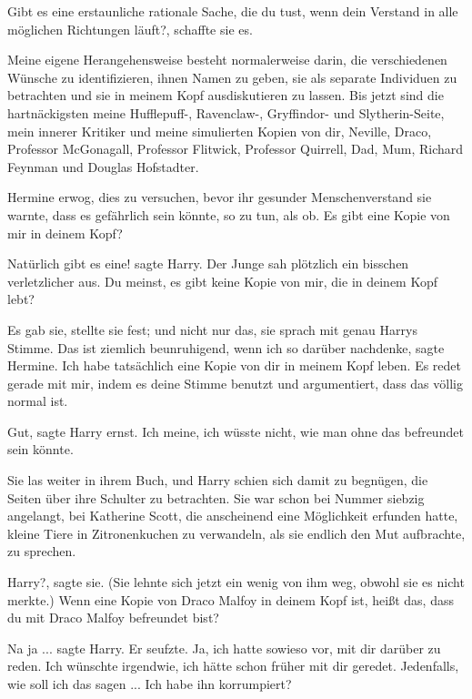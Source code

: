 \glqq{}Gibt es eine erstaunliche rationale Sache, die du tust, wenn dein Verstand
in alle möglichen Richtungen läuft?\grqq{}, schaffte sie es.

\glqq{}Meine eigene Herangehensweise besteht normalerweise darin, die
verschiedenen Wünsche zu identifizieren, ihnen Namen zu geben, sie als separate
Individuen zu betrachten und sie in meinem Kopf ausdiskutieren zu lassen. Bis
jetzt sind die hartnäckigsten meine Hufflepuff-, Ravenclaw-, Gryffindor- und
Slytherin-Seite, mein innerer Kritiker und meine simulierten Kopien von dir,
Neville, Draco, Professor McGonagall, Professor Flitwick, Professor Quirrell,
Dad, Mum, Richard Feynman und Douglas Hofstadter.\grqq{}

Hermine erwog, dies zu versuchen, bevor ihr gesunder Menschenverstand sie
warnte, dass es gefährlich sein könnte, so zu tun, als ob. \glqq{}Es gibt eine
Kopie von mir in deinem Kopf?\grqq{}

\glqq{}Natürlich gibt es eine!\grqq{} sagte Harry. Der Junge sah plötzlich ein
bisschen verletzlicher aus. \glqq{}Du meinst, es gibt keine Kopie von mir, die in
deinem Kopf lebt?\grqq{}

Es gab sie, stellte sie fest; und nicht nur das, sie sprach mit genau Harrys
Stimme. \glqq{}Das ist ziemlich beunruhigend, wenn ich so darüber
nachdenke\grqq{}, sagte Hermine. \glqq{}Ich habe tatsächlich eine Kopie von dir
in meinem Kopf leben. Es redet gerade mit mir, indem es deine Stimme benutzt und
argumentiert, dass das völlig normal ist.\grqq{}

\glqq{}Gut\grqq{}, sagte Harry ernst. \glqq{}Ich meine, ich wüsste nicht, wie man
ohne das befreundet sein könnte.\grqq{}

Sie las weiter in ihrem Buch, und Harry schien sich damit zu begnügen, die
Seiten über ihre Schulter zu betrachten. Sie war schon bei Nummer siebzig
angelangt, bei Katherine Scott, die anscheinend eine Möglichkeit erfunden hatte,
kleine Tiere in Zitronenkuchen zu verwandeln, als sie endlich den Mut
aufbrachte, zu sprechen.

\glqq{}Harry?\grqq{}, sagte sie. (Sie lehnte sich jetzt ein wenig von ihm weg,
obwohl sie es nicht merkte.) \glqq{}Wenn eine Kopie von Draco Malfoy in deinem
Kopf ist, heißt das, dass du mit Draco Malfoy befreundet bist?\grqq{}

\glqq{}Na ja ...\grqq{} sagte Harry. Er seufzte. \glqq{}Ja, ich hatte sowieso vor,
mit dir darüber zu reden. Ich wünschte irgendwie, ich hätte schon früher mit dir
geredet. Jedenfalls, wie soll ich das sagen ... Ich habe ihn korrumpiert?\grqq{}

